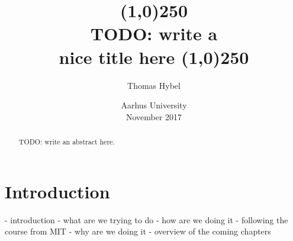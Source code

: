 \documentclass{article}
\title{
\line(1,0){250}\\
\Large \bfseries
TODO: write a \\
nice title here
\line(1,0){250}
}
\author{Thomas Hybel}
\date{Aarhus University \\ November 2017}
\begin{document}
\maketitle

\begin{abstract} 
\noindent 
TODO: write an abstract here.
\end{abstract}
\newpage

\tableofcontents
\newpage
{}




\section{Introduction}


- introduction
	- what are we trying to do
	- how are we doing it
		- following the course from MIT
	- why are we doing it
	- overview of the coming chapters










\end{document}
